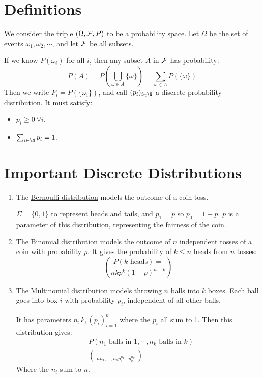 \documentclass[../Main.tex]{subfiles}
\begin{document}
\section{Definitions}
We consider the triple $(\Omega, \mathcal{F}, P)$ to be a probability space. Let $\Omega$ be the set of events $\omega_1, \omega_2, \cdots$, and let $\mathcal{F}$ be all subsets.\par
If we know $P(\omega_i)$ for all $i$, then any subset $A$ in $\mathcal{F}$ has probability:
\begin{equation}
    P(A) = P\left(\bigcup_{\omega \in A} \{\omega\}\right) = \sum_{\omega \in A}P(\{\omega\})
    \label{eqnFiniteCountAdd}
\end{equation}
Then we write $P_i = P(\{\omega_i\})$, and call $(p_i)_{i \in \N}$ a discrete probability distribution. It must satisfy:
\begin{itemize}
    \item $p_i \geq 0~\forall i$,
    \item $\sum_{i \in \N} p_i = 1$.
\end{itemize}
\section{Important Discrete Distributions}
\begin{enumerate}
    \item The \underline{Bernoulli distribution} models the outcome of a coin toss.\par
        $\Sigma = \{0, 1\}$ to represent heads and tails, and $p_1 = p$ so $p_0 = 1-p$. $p$ is a parameter of this distribution, representing the fairness of the coin.
    \item The \underline{Binomial distribution} models the outcome of $n$ independent tosses of a coin with probability $p$. It gives the probability of $k \leq n$ heads from $n$ tosses:
        \begin{equation*}
            P(k \text{ heads}) = \choose{n}{k}p^k(1-p)^{n-k}
        \end{equation*}
    \item The \underline{Multinomial distribution} models throwing $n$ balls into $k$ boxes. Each ball goes into box $i$ with probability $p_i$, independent of all other balls.\par
        It has parameters $n, k, (p_i)_{i=1}^k$ where the $p_i$ all sum to 1. Then this distribution gives:
        \begin{align*}
            &P(n_1 \text{ balls in }1, \cdots, n_k \text{ balls in } k) \\
            &= \choose{n}{n_1, \cdots, n_k} p_1^{n_1} \cdots p_k^{n_k}
        \end{align*}
        Where the $n_i$ sum to $n$.
\end{enumerate}
\end{document}
